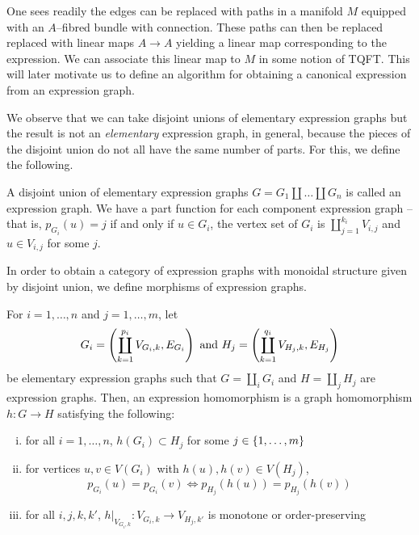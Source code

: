 \documentclass[./Thick_TQFTs_and_Quantum_Information.tex]{subfiles}
\begin{document}
\begin{exm}
One sees readily the edges can be replaced with paths in a manifold $M$ equipped
with an $A$--fibred bundle with connection. These paths can then be replaced
replaced with linear maps $A \to A$ yielding a linear map corresponding to the
expression. We can associate this linear map to $M$ in some notion of TQFT. This
will later motivate us to define an algorithm for obtaining a canonical
expression from an expression graph.
\end{exm}

We observe that we can take disjoint unions of elementary expression graphs but
the result is not an \textit{elementary} expression graph, in general, because
the pieces of the disjoint union do not all have the same number of parts. For
this, we define the following.

\begin{defn}
A disjoint union of elementary expression graphs
$G = G_1 \amalg \dots \amalg G_n$ is called an expression graph. We have a part
function for each component expression graph -- that is, $p_{G_i}(u) = j$ if and
only if $u \in G_i$, the vertex set of $G_i$ is $\coprod_{j = 1}^{k_i} V_{i, j}$
and $u \in V_{i, j}$ for some $j$.
\end{defn}

In order to obtain a category of expression graphs with monoidal structure given
by disjoint union, we define morphisms of expression graphs.

\begin{defn}
For $i = 1, \dots, n$ and $j = 1, \dots, m$, let
\[
  G_i = \left( \coprod_{k = 1}^{p_i} V_{G_i, k}, E_{G_i} \right) \text{ and }
  H_j = \left( \coprod_{k = 1}^{q_i} V_{H_j, k}, E_{H_j} \right)
\]
be elementary expression graphs such that $G = \coprod_{i} G_i$ and
$H = \coprod_{j} H_j$ are expression graphs. Then, an expression homomorphism is
a graph homomorphism $h : G \to H$ satisfying the following:
\begin{enumerate}[(i)]

\item\label{exhom:elem}
for all $i = 1, \dots, n$, $h(G_i) \subset H_j$ for some
$j \in \set{1, \dots, m}$

\item\label{exhom:part}
for vertices $u, v \in V(G_i)$ with $h(u), h(v) \in V(H_j)$,
\[
  p_{G_i}(u) = p_{G_i}(v) \iff p_{H_j}(h(u)) = p_{H_j}(h(v))
\]

\item\label{exhom:monotone}
for all $i, j, k, k'$, $h|_{V_{G_i, k}} : V_{G_i, k} \to V_{H_j, k'}$ is
monotone or order-preserving

\end{enumerate}
\end{defn}
\end{document}
